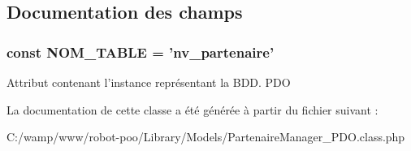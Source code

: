\subsection{Documentation des champs}
\hypertarget{class_library_1_1_models_1_1_partenaire_manager___p_d_o_a243755033f10b0817aa9d990cc252817}{
\subsubsection[{N\+O\+M\+\_\+\+T\+A\+B\+L\+E}]{\setlength{\rightskip}{0pt plus 5cm}const N\+O\+M\+\_\+\+T\+A\+B\+L\+E = 'nv\+\_\+partenaire'}}\label{class_library_1_1_models_1_1_partenaire_manager___p_d_o_a243755033f10b0817aa9d990cc252817}
Attribut contenant l'instance représentant la B\+D\+D.  P\+D\+O 

La documentation de cette classe a été générée à partir du fichier suivant \+:\begin{DoxyCompactItemize}
\item 
C\+:/wamp/www/robot-\/poo/\+Library/\+Models/Partenaire\+Manager\+\_\+\+P\+D\+O.\+class.\+php\end{DoxyCompactItemize}
